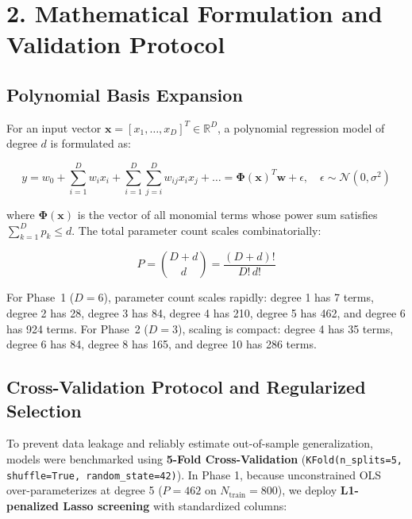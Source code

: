 \documentclass[11pt,a4paper]{article}
\begin{document}
\newpage

\section{\color{primary} 2. Mathematical Formulation and Validation Protocol}

\subsection{Polynomial Basis Expansion}
For an input vector $\mathbf{x} = [x_1, \dots, x_D]^T \in \mathbb{R}^D$, a polynomial regression model of degree $d$ is formulated as:

\begin{eqbox}
\begin{equation}
y = w_0 + \sum_{i=1}^D w_i x_i + \sum_{i=1}^D \sum_{j=i}^D w_{ij} x_i x_j + \dots = \boldsymbol{\Phi}(\mathbf{x})^T \mathbf{w} + \epsilon, \quad \epsilon \sim \mathcal{N}(0, \sigma^2)
\end{equation}
\end{eqbox}

\noindent where $\boldsymbol{\Phi}(\mathbf{x})$ is the vector of all monomial terms whose power sum satisfies $\sum_{k=1}^D p_k \le d$. The total parameter count scales combinatorially:

\begin{eqbox}
\begin{equation}
P = \binom{D + d}{d} = \frac{(D + d)!}{D! \, d!}
\end{equation}
\end{eqbox}

\noindent For Phase~1 ($D = 6$), parameter count scales rapidly: degree 1 has 7 terms, degree 2 has 28, degree 3 has 84, degree 4 has 210, degree 5 has 462, and degree 6 has 924 terms. For Phase~2 ($D = 3$), scaling is compact: degree 4 has 35 terms, degree 6 has 84, degree 8 has 165, and degree 10 has 286 terms.

\subsection{Cross-Validation Protocol and Regularized Selection}
To prevent data leakage and reliably estimate out-of-sample generalization, models were benchmarked using \textbf{5-Fold Cross-Validation} (\texttt{KFold(n\_splits=5, shuffle=True, random\_state=42)}). In Phase 1, because unconstrained OLS over-parameterizes at degree 5 ($P = 462$ on $N_{\text{train}} = 800$), we deploy \textbf{L1-penalized Lasso screening} with standardized columns:
\end{document}
